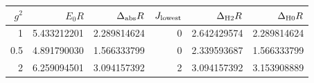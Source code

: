 \begin{tabular}{@{}rrrrrr@{}}\toprule
$g^2$ & $E_0R$ & $\Delta_{\rm abs}R$ & $J_{\rm lowest}$ & $\Delta_{\mathrm{H2}}R$ & $\Delta_{\mathrm{H0}}R$\\\midrule
1 & 5.433212201 & 2.289814624 & 0 & 2.642429574 & 2.289814624 \\
0.5 & 4.891790030 & 1.566333799 & 0 & 2.339593687 & 1.566333799 \\
2 & 6.259094501 & 3.094157392 & 2 & 3.094157392 & 3.153908889 \\
\bottomrule\end{tabular}
